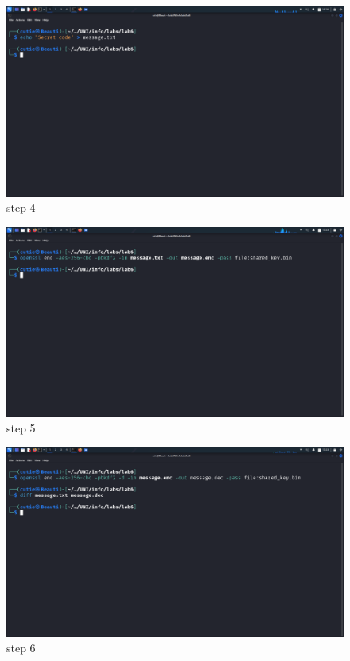 \documentclass{article}
\numberwithin{equation}{subsection}
\begin{document}
\begin{center}
	\begin{figure}[H]
		\includegraphics[width=400pt]{pic/1.4.png}
		\caption{step 4}
	\end{figure}


	\begin{figure}[H]
		\includegraphics[width=400pt]{pic/1.5.png}
		\caption{step 5}
	\end{figure}


	\begin{figure}[H]
		\includegraphics[width=400pt]{pic/1.6.png}
		\caption{step 6}
	\end{figure}

\end{center}
\end{document}
